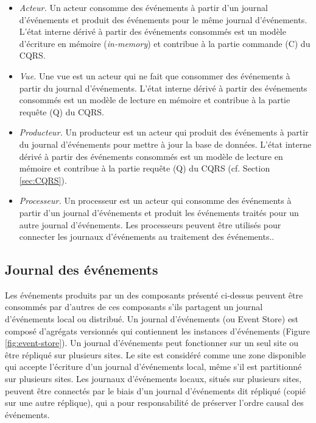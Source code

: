 \begin{itemize}
	\item \textit{Acteur.} Un acteur consomme des événements à partir d'un journal 
	d'événements et produit des événements pour le même journal d'événements. 
	L'état interne dérivé à partir des événements consommés est un modèle 
	d'écriture 
	en mémoire (\textit{in-memory}) et contribue à la partie commande (C) du 
	\gls{CQRS}.
	\item \textit{Vue.} Une vue est un acteur qui ne fait que consommer des 
	événements à 
	partir du journal d'événements. L'état interne dérivé à partir des événements 
	consommés est un modèle de lecture en mémoire et contribue à la partie 
	requête (Q) du \gls{CQRS}.
	\item \textit{Producteur.} Un producteur est un acteur qui produit des 
	événements à partir du journal d'événements pour mettre à jour la base 
	de données. L'état interne dérivé à partir des événements consommés est 
	un modèle de lecture en mémoire et 
	contribue à la partie requête (Q) du CQRS (cf. Section \ref{sec:CQRS}).
	\item \textit{Processeur.} Un processeur est un acteur qui consomme des 
	événements à partir d'un journal d'événements et produit les événements 
	traités pour un autre journal d'événements. Les processeurs peuvent être 
	utilisés pour connecter les journaux d'événements au traitement des 
	événements..
\end{itemize}


\subsection{Journal des événements}

Les événements produits par un des composants présenté ci-dessus
peuvent être consommés par d'autres de ces composants s'ils partagent un 
journal d'événements local ou distribué. Un journal d'événements (ou Event Store) 
est composé d'agrégats versionnés qui contiennent les instances d'événements 
(Figure \ref{fig:event-store}).
Un journal d'événements peut fonctionner sur un seul site ou être répliqué sur 
plusieurs sites. 
Le site est considéré comme une zone disponible qui accepte 
l'écriture d'un journal d'événements local, même s'il est partitionné sur plusieurs 
sites. Les journaux d'événements locaux, situés sur plusieurs sites, peuvent être 
connectés par le biais d'un journal d'événements dit \og répliqué\fg{} (copié sur une 
autre réplique), qui a pour responsabilité de préserver l'ordre causal des 
événements.

